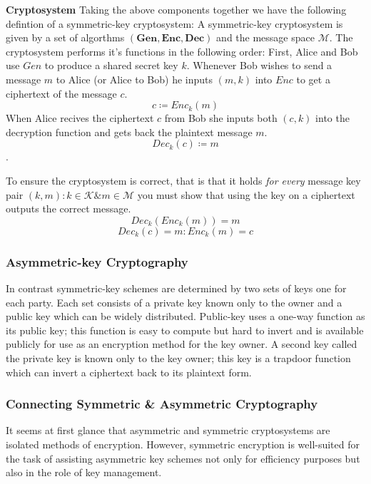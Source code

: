 \textbf{Cryptosystem}
\medskip
Taking the above components together we have the following defintion of a symmetric-key \gls{cryptosystem}:
\newline
A symmetric-key cryptosystem is given by a set of algorthms $\mathbf{(Gen, Enc, Dec)}$ and the message space $\mathcal{M}$.
\newline
The cryptosystem performs it's functions in the following order:
\newline
First, Alice and Bob use $Gen$ to produce a shared secret key $k$.
\newline
Whenever Bob wishes to send a message $m$ to Alice (or Alice to Bob) he inputs $(m,k)$ into $Enc$ to get a ciphertext of the message $c$.
$$c \coloneqq Enc_{k}(m)$$
\newline
When Alice recives the ciphertext $c$ from Bob she inputs both $(c,k)$ into the decryption function and gets back the plaintext message $m$.
$$Dec_{k}(c) \coloneqq m$$.
\medskip

To ensure the cryptosystem is correct, that is that it holds \textit{for every} message key pair $(k,m) : k \in \mathcal{K} \& m \in \mathcal{M}$ you must show that using the key on a ciphertext outputs the correct message. 
$$Dec_{k}(Enc_{k}(m)) = m$$
\newline
$$Dec_{k}(c) = m : Enc_{k}(m) = c$$



\subsubsection{Asymmetric-key Cryptography}
In contrast symmetric-key schemes are determined by two sets of keys one for each party. Each set consists of a \gls{private key} known only to the owner and a \gls{public key} which can be widely distributed.
Public-key uses a \gls{one-way function} as its public key; this function is easy to compute but hard to invert and is available publicly for use as an encryption method for the key owner. A second key called the private key is known only to the key owner; this key is a \gls{trapdoor function} which can invert a ciphertext back to its plaintext form.


 
\subsubsection{Connecting Symmetric \& Asymmetric Cryptography}
It seems at first glance that asymmetric and symmetric cryptosystems are isolated methods of encryption. However, symmetric encryption is well-suited for the task of assisting asymmetric key schemes not only for efficiency purposes but also in the role of key management. 